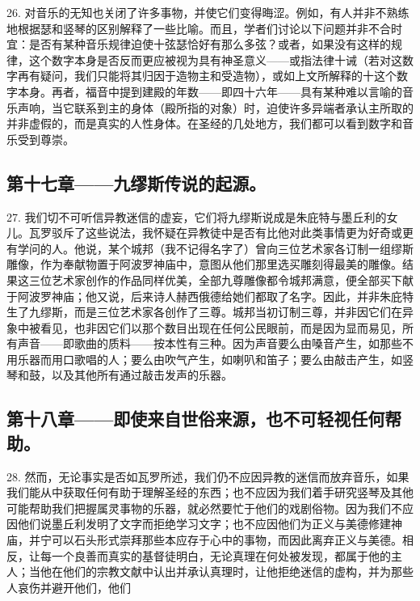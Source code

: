 26. 对音乐的无知也关闭了许多事物，并使它们变得晦涩。例如，有人并非不熟练地根据瑟和竖琴的区别解释了一些比喻。而且，学者们讨论以下问题并非不合时宜：是否有某种音乐规律迫使十弦瑟恰好有那么多弦？或者，如果没有这样的规律，这个数字本身是否反而更应被视为具有神圣意义——或指法律十诫（若对这数字再有疑问，我们只能将其归因于造物主和受造物），或如上文所解释的十这个数字本身。再者，福音中提到建殿的年数——即四十六年——具有某种难以言喻的音乐声响，当它联系到主的身体（殿所指的对象）时，迫使许多异端者承认主所取的并非虚假的，而是真实的人性身体。在圣经的几处地方，我们都可以看到数字和音乐受到尊崇。\par


\subsection{第十七章——九缪斯传说的起源。}

27. 我们切不可听信异教迷信的虚妄，它们将九缪斯说成是朱庇特与墨丘利的女儿。瓦罗驳斥了这些说法，我怀疑在异教徒中是否有比他对此类事情更为好奇或更有学问的人。他说，某个城邦（我不记得名字了）曾向三位艺术家各订制一组缪斯雕像，作为奉献物置于阿波罗神庙中，意图从他们那里选买雕刻得最美的雕像。结果这三位艺术家创作的作品同样优美，全部九尊雕像都令城邦满意，便全部买下献于阿波罗神庙；他又说，后来诗人赫西俄德给她们都取了名字。因此，并非朱庇特生了九缪斯，而是三位艺术家各创作了三尊。城邦当初订制三尊，并非因它们在异象中被看见，也非因它们以那个数目出现在任何公民眼前，而是因为显而易见，所有声音——即歌曲的质料——按本性有三种。因为声音要么由嗓音产生，如那些不用乐器而用口歌唱的人；要么由吹气产生，如喇叭和笛子；要么由敲击产生，如竖琴和鼓，以及其他所有通过敲击发声的乐器。\par


\subsection{第十八章——即使来自世俗来源，也不可轻视任何帮助。}

28. 然而，无论事实是否如瓦罗所述，我们仍不应因异教的迷信而放弃音乐，如果我们能从中获取任何有助于理解圣经的东西；也不应因为我们着手研究竖琴及其他可能帮助我们把握属灵事物的乐器，就必然要忙于他们的戏剧俗物。因为我们不应因他们说墨丘利发明了文字而拒绝学习文字；也不应因他们为正义与美德修建神庙，并宁可以石头形式崇拜那些本应存于心中的事物，而因此离弃正义与美德。相反，让每一个良善而真实的基督徒明白，无论真理在何处被发现，都属于他的主人；当他在他们的宗教文献中认出并承认真理时，让他拒绝迷信的虚构，并为那些人哀伤并避开他们，他们\par

